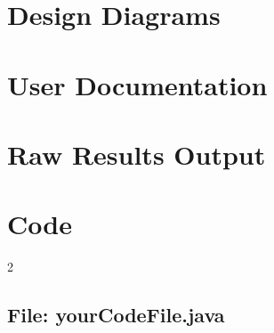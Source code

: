 \documentclass[12pt,a4paper]{report}
\begin{document}

\chapter{Design Diagrams}

\chapter{User Documentation}

\chapter{Raw Results Output}

\chapter{Code}


\begin{landscape}
\begin{multicols}{2}
\section{File: yourCodeFile.java}

\end{multicols}
\end{landscape}
\end{document}
